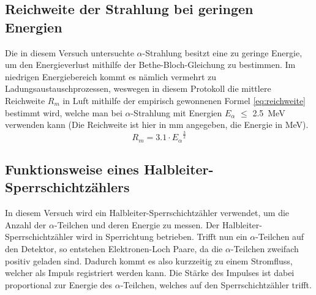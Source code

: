 \subsection{Reichweite der Strahlung bei geringen Energien}

Die in diesem Versuch untersuchte $\alpha$-Strahlung besitzt eine zu
geringe Energie, um den Energieverlust mithilfe der
Bethe-Bloch-Gleichung zu bestimmen. Im niedrigen Energiebereich kommt es
nämlich vermehrt zu Ladungsaustauschprozessen, weswegen in diesem
Protokoll die mittlere Reichweite  $R_m$ in Luft mithilfe der empirisch
gewonnenen Formel \eqref{eq:reichweite} bestimmt wird, welche man bei
$\alpha$-Strahlung mit Energien $E_{\alpha}$ $\le$
\SI{2.5}{\mega\electronvolt} verwenden kann (Die Reichweite ist hier in
\si{\milli\metre} angegeben, die Energie in \si{\mega\electronvolt}).
\begin{equation}
\label{eq:reichweite}
R_m = 3.1 \cdot {E_\alpha} ^{\frac{3}{2}}
\end{equation}

\subsection{Funktionsweise eines Halbleiter-Sperrschichtzählers}

In diesem Versuch wird ein Halbleiter-Sperrschichtzähler verwendet, um
die Anzahl der $\alpha$-Teilchen und deren Energie zu messen. Der
Halbleiter-Sperrschichtzähler wird in Sperrichtung betrieben. Trifft nun
ein $\alpha$-Teilchen auf den Detektor, so entstehen Elektronen-Loch
Paare, da die $\alpha$-Teilchen zweifach positiv geladen sind. Dadurch
kommt es also kurzzeitig zu einem Stromfluss, welcher als Impuls
registriert werden kann. Die Stärke des Impulses ist dabei proportional
zur Energie des $\alpha$-Teilchen, welches auf den Sperrschichtzähler
trifft.

